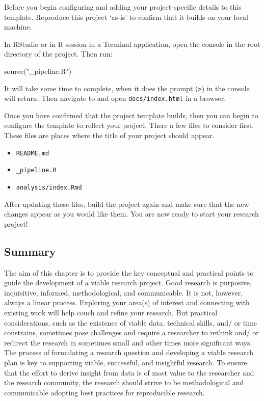 \documentclass[
]{article}
\newenvironment{Shaded}{\begin{snugshade}}{\end{snugshade}}
\newcommand{\FunctionTok}[1]{\textcolor[rgb]{0.00,0.00,0.00}{#1}}
\newcommand{\NormalTok}[1]{#1}
\newcommand{\StringTok}[1]{\textcolor[rgb]{0.31,0.60,0.02}{#1}}
\providecommand{\tightlist}{%
  \setlength{\itemsep}{0pt}\setlength{\parskip}{0pt}}
\begin{document}
Before you begin configuring and adding your project-specific details to this template. Reproduce this project `as-is' to confirm that it builds on your local machine.

In RStudio or in R session in a Terminal application, open the console in the root directory of the project. Then run:

\begin{Shaded}
\begin{Highlighting}[]
\FunctionTok{source}\NormalTok{(}\StringTok{"\_pipeline.R"}\NormalTok{)}
\end{Highlighting}
\end{Shaded}

It will take some time to complete, when it does the prompt (\texttt{\textgreater{}}) in the console will return. Then navigate to and open \texttt{docs/index.html} in a browser.

Once you have confirmed that the project template builds, then you can begin to configure the template to reflect your project. There a few files to consider first. These files are places where the title of your project should appear.

\begin{itemize}
\tightlist
\item
  \texttt{README.md}
\item
  \texttt{\_pipeline.R}
\item
  \texttt{analysis/index.Rmd}
\end{itemize}

After updating these files, build the project again and make sure that the new changes appear as you would like them. You are now ready to start your research project!

\hypertarget{summary-3}{%
\subsection*{Summary}\label{summary-3}}

The aim of this chapter is to provide the key conceptual and practical points to guide the development of a viable research project. Good research is purposive, inquisitive, informed, methodological, and communicable. It is not, however, always a linear process. Exploring your area(s) of interest and connecting with existing work will help couch and refine your research. But practical considerations, such as the existence of viable data, technical skills, and/ or time constrains, sometimes pose challenges and require a researcher to rethink and/ or redirect the research in sometimes small and other times more significant ways. The process of formulating a research question and developing a viable research plan is key to supporting viable, successful, and insightful research. To ensure that the effort to derive insight from data is of most value to the researcher and the research community, the research should strive to be methodological and communicable adopting best practices for reproducible research.
\end{document}
